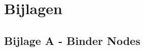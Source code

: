 \documentclass[a4paper]{report}
\begin{document}
\chapter{Bijlagen}
\section{Bijlage A - Binder Nodes}
\label{bijlage:bindernodes}
\begin{minipage}{\textwidth}
  \centering
\end{minipage}
\clearpage
\end{document}
